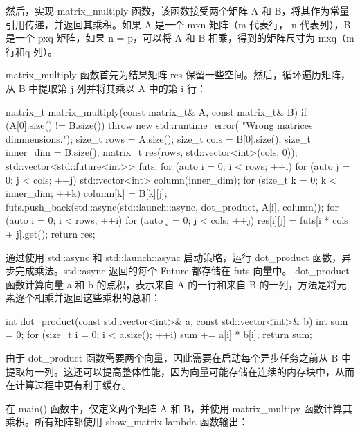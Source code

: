 然后，实现 matrix\_multiply 函数，该函数接受两个矩阵 A 和 B，将其作为常量引用传递，并返回其乘积。如果 A 是一个 mxn 矩阵（m 代表行， n 代表列），B 是一个 pxq 矩阵，如果 n = p，可以将 A 和 B 相乘，得到的矩阵尺寸为 mxq（m 行和q 列）。

matrix\_multiply 函数首先为结果矩阵 res 保留一些空间。然后，循环遍历矩阵，从 B 中提取第 j 列并将其乘以 A 中的第 i 行：

\begin{cpp}
matrix_t matrix_multiply(const matrix_t& A,
                         const matrix_t& B) {
    if (A[0].size() != B.size()) {
        throw new std::runtime_error(
                  "Wrong matrices dimmensions.");
    }
    size_t rows = A.size();
    size_t cols = B[0].size();
    size_t inner_dim = B.size();
    matrix_t res(rows, std::vector<int>(cols, 0));
    std::vector<std::future<int>> futs;
    for (auto i = 0; i < rows; ++i) {
        for (auto j = 0; j < cols; ++j) {
            std::vector<int> column(inner_dim);
            for (size_t k = 0; k < inner_dim; ++k) {
                column[k] = B[k][j];
            }
            futs.push_back(std::async(std::launch::async,
                                      dot_product,
                                      A[i], column));
        }
    }
    for (auto i = 0; i < rows; ++i) {
        for (auto j = 0; j < cols; ++j) {
            res[i][j] = futs[i * cols + j].get();
        }
    }
    return res;
}
\end{cpp}

通过使用 std::async 和 std::launch::async 启动策略，运行 dot\_product 函数，异步完成乘法。std::async 返回的每个 Future 都存储在 futs 向量中。 dot\_product 函数计算向量 a 和 b 的点积，表示来自 A 的一行和来自 B 的一列，方法是将元素逐个相乘并返回这些乘积的总和：

\begin{cpp}
int dot_product(const std::vector<int>& a,
                const std::vector<int>& b) {
    int sum = 0;
    for (size_t i = 0; i < a.size(); ++i) {
        sum += a[i] * b[i];
    }
    return sum;
}
\end{cpp}

由于 dot\_product 函数需要两个向量，因此需要在启动每个异步任务之前从 B 中提取每一列。这还可以提高整体性能，因为向量可能存储在连续的内存块中，从而在计算过程中更有利于缓存。

在 main() 函数中，仅定义两个矩阵 A 和 B，并使用 matrix\_multipy 函数计算其乘积。所有矩阵都使用 show\_matrix lambda 函数输出：

